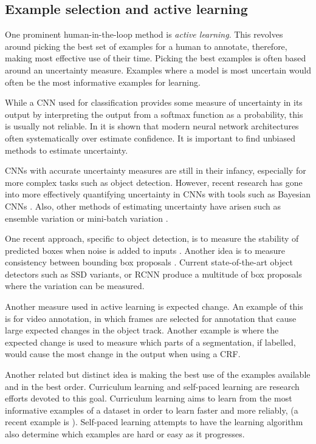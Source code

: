 \subsection{Example selection and active learning} 

One prominent human-in-the-loop method is \emph{active learning}. This revolves around picking the best set of examples for a human to annotate, therefore, making most effective use of their time. Picking the best examples is often based around an uncertainty measure. Examples where a model is most uncertain would often be the most informative examples for learning. 
 
While a \gls{CNN} used for classification provides some measure of uncertainty in its output by interpreting the output from a softmax function as a probability, this is usually not reliable. In \cite{Guo2017} it is shown that modern neural network architectures often systematically over estimate confidence. It is important to find unbiased methods to estimate uncertainty.

\gls{CNN}s with accurate uncertainty measures are still  in their infancy, especially for more complex tasks such as object detection. However, recent research has gone into more effectively quantifying uncertainty in \gls{CNN}s with tools such as Bayesian \gls{CNN}s \cite{Gal2017}. Also, other methods of estimating uncertainty have arisen such as ensemble variation \cite{Beluch2018} or mini-batch variation \cite{Chang2017}.

 One recent approach, specific to object detection, is to measure the stability of predicted boxes when noise is added to inputs \cite{Kao2018}. Another idea is to measure consistency between bounding box proposals \cite{Kao2018, Brust2018, Le2018}. Current state-of-the-art object detectors such as \gls{SSD}  \cite{Liu2016a} variants, or \gls{RCNN} \cite{Wang2017} produce a multitude of box proposals where the variation can be measured.

Another measure used in active learning is expected change. An example of this is \cite{Vondrick2011} for video annotation, in which frames are selected for annotation that cause large expected changes in the object track. Another example is \cite{Xu2017} where the expected change is used to measure which parts of a segmentation, if labelled, would cause the most change in the output when using a \gls{CRF}.

Another related but distinct idea is making the best use of the examples available and in the best order. Curriculum learning and self-paced learning \cite{Kumar2010} are research efforts devoted to this goal. Curriculum learning aims to learn from the most informative examples of a dataset in order to learn faster and more reliably, (a recent example is \cite{Katharopoulos2018}). Self-paced learning attempts to have the learning algorithm also determine which examples are hard or easy as it progresses.



